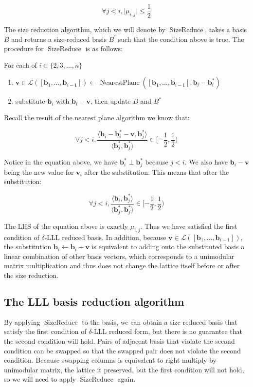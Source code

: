 \documentclass[letterpaper,12pt]{article}
\begin{document}
$$
\forall j<i, \vert\mu_{i, j}\vert \leq \frac{1}{2}
$$

The size reduction algorithm, which we will denote by $\operatorname{SizeReduce}$, takes a basis $B$ and returns a size-reduced basis $B^\prime$ such that the condition above is true. The procedure for $\operatorname{SizeReduce}$ is as follows:

For each of $i \in \{2, 3, \ldots, n\}$
\begin{enumerate}
    \item $\mathbf{v} \in \mathcal{L}([\mathbf{b}_1, \ldots, \mathbf{b}_{i-1}]) \leftarrow \operatorname{NearestPlane}([\mathbf{b}_1, \ldots, \mathbf{b}_{i-1}], \mathbf{b}_i - \mathbf{b}_i^\ast)$
    \item substitute $\mathbf{b}_i$ with $\mathbf{b}_i - \mathbf{v}$, then update $B$ and $B^\ast$
\end{enumerate}

Recall the result of the nearest plane algorithm we know that:

$$
\forall j < i,
\frac{
    \langle
        \mathbf{b}_i - \mathbf{b}_i^\ast - \mathbf{v}, \mathbf{b}_j^\ast
    \rangle
}{
    \langle 
        \mathbf{b}_j^\ast, \mathbf{b}_j^\ast
    \rangle
} \in [-\frac{1}{2}, \frac{1}{2})
$$

Notice in the equation above, we have $\mathbf{b}_i^\ast \perp \mathbf{b}_j^\ast$ because $j < i$. We also have $\mathbf{b}_i - \mathbf{v}$ being the new value for $\mathbf{v}_i$ after the substitution. This means that after the substitution:

$$
\forall j < i,
\frac{
    \langle
        \mathbf{b}_i, \mathbf{b}_j^\ast
    \rangle
}{
    \langle
        \mathbf{b}_j^\ast, \mathbf{b}_j^\ast
    \rangle
} \in [-\frac{1}{2}, \frac{1}{2})
$$

The LHS of the equation above is exactly $\mu_{i,j}$. Thus we have satisfied the first condition of $\delta$-LLL reduced basis. In addition, because $\mathbf{v} \in \mathcal{L}([\mathbf{b}_1, \ldots, \mathbf{b}_{i-1}])$, the substitution $\mathbf{b}_i \leftarrow \mathbf{b}_i - \mathbf{v}$ is equivalent to adding onto the substituted basis a linear combination of other basis vectors, which corresponds to a unimodular matrix multiplication and thus does not change the lattice itself before or after the size reduction.

\subsection{The LLL basis reduction algorithm}
By applying $\operatorname{SizeReduce}$ to the basis, we can obtain a size-reduced basis that satisfy the first condition of $\delta$-LLL reduced form, but there is no guarantee that the second condition will hold. Pairs of adjacent basis that violate the second condition can be swapped so that the swapped pair does not violate the second condition. Because swapping columns is equivalent to right multiply by unimodular matrix, the lattice it preserved, but the first condition will not hold, so we will need to apply $\operatorname{SizeReduce}$ again.
\end{document}
